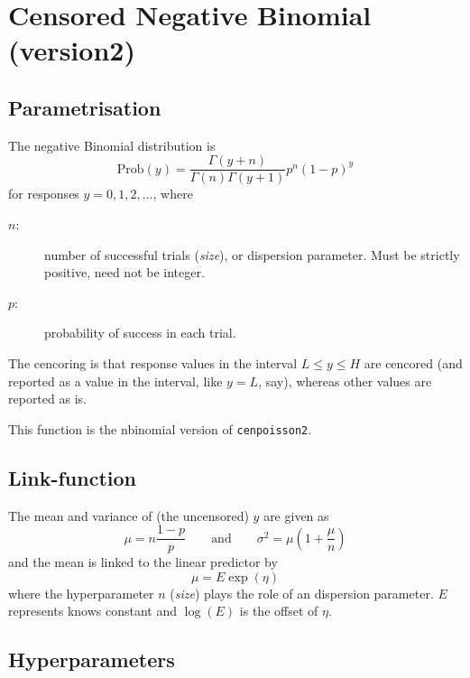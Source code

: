 \documentclass[a4paper,11pt]{article}
\begin{document}
\section*{Censored Negative Binomial (version2)}

\subsection*{Parametrisation}

The negative Binomial distribution is
\begin{displaymath}
    \text{Prob}(y) = \frac{\Gamma(y+n)}{\Gamma(n) \Gamma(y+1)} p^n (1-p)^y
\end{displaymath}
for responses $y=0, 1, 2, \ldots$, where
\begin{description}
\item[$n$:] number of successful trials (\emph{size}), or dispersion
    parameter. Must be strictly positive, need not be integer.
\item[$p$:] probability of success in each trial.
\end{description}

The cencoring is that response values in the interval $L \le y \le H$
are cencored (and reported as a value in the interval, like $y = L$,
say), whereas other values are reported as is.

This function is the nbinomial version of \texttt{cenpoisson2}.

\subsection*{Link-function}

The mean and variance of (the uncensored) $y$ are given as
\begin{displaymath}
    \mu = n \frac{1-p}{p} \qquad\text{and}\qquad \sigma^{2} = \mu(1 + \frac{\mu}{n})
\end{displaymath}
and the mean is linked to the linear predictor by
\begin{displaymath}
    \mu = E \exp(\eta)
\end{displaymath}
where the hyperparameter $n$ (\emph{size}) plays the role of an
dispersion parameter. $E$ represents knows constant and $\log(E)$ is
the offset of $\eta$.

\subsection*{Hyperparameters}
\end{document}
